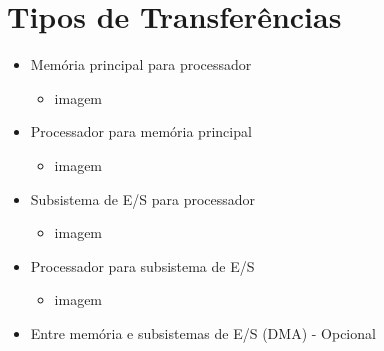 \documentclass[12pt]{article}
\begin{document}
    \section{Tipos de Transferências}
    \begin{itemize}
        \item Memória principal para processador
        \begin{itemize}
            \item[] imagem
        \end{itemize}
        \item Processador para memória principal
        \begin{itemize}
            \item[] imagem
        \end{itemize}
        \item Subsistema de E/S para processador
        \begin{itemize}
            \item[] imagem
        \end{itemize}
        \item Processador para subsistema de E/S
        \begin{itemize}
            \item[] imagem
        \end{itemize}
        \item Entre memória e subsistemas de E/S (DMA) - Opcional
    \end{itemize}
\end{document}

